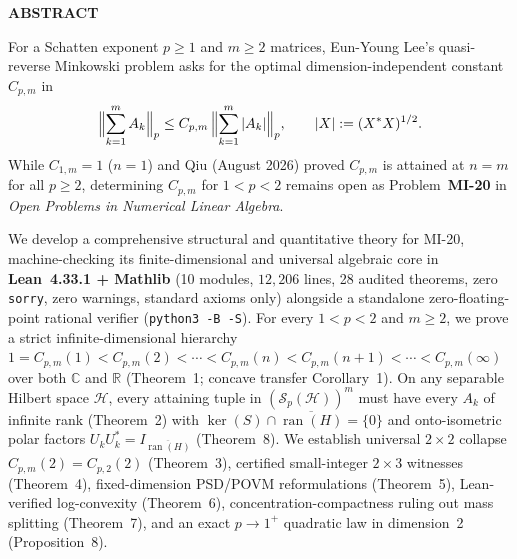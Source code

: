\documentclass[10pt,letterpaper]{article}
\newcommand{\C}{\mathbb{C}}
\newcommand{\R}{\mathbb{R}}
\newcommand{\Hilb}{\mathcal{H}}
\newcommand{\Sp}{\mathcal{S}_p}
\newcommand{\ran}{\operatorname{ran}}
\begin{document}
\begin{tcolorbox}[abstractbox]
{\sffamily\footnotesize\bfseries\color{accentblue}ABSTRACT}\par\vspace{1.5pt}
{\small
For a Schatten exponent $p \ge 1$ and $m \ge 2$ matrices, Eun-Young Lee's quasi-reverse Minkowski problem asks for the optimal dimension-independent constant $C_{p,m}$ in
\[
  \Bigl\|\sum_{k=1}^m A_k\Bigr\|_p \le C_{p,m}\,\Bigl\|\sum_{k=1}^m |A_k|\Bigr\|_p,
  \qquad |X| := (X^* X)^{1/2}.
\]
While $C_{1,m} = 1$ ($n = 1$) and Qiu (August 2026) proved $C_{p,m}$ is attained at $n = m$ for all $p \ge 2$, determining $C_{p,m}$ for $1 < p < 2$ remains open as Problem~\textbf{MI-20} in \emph{Open Problems in Numerical Linear Algebra}.

We develop a comprehensive structural and quantitative theory for MI-20, machine-checking its finite-dimensional and universal algebraic core in \textbf{Lean~4.33.1 + Mathlib} (10 modules, $12{,}206$ lines, 28 audited theorems, zero \texttt{sorry}, zero warnings, standard axioms only) alongside a standalone zero-floating-point rational verifier (\texttt{python3 -B -S}). For every $1 < p < 2$ and $m \ge 2$, we prove a strict infinite-dimensional hierarchy $1 = C_{p,m}(1) < C_{p,m}(2) < \cdots < C_{p,m}(n) < C_{p,m}(n+1) < \cdots < C_{p,m}(\infty)$ over both $\C$ and $\R$ (Theorem~1; concave transfer Corollary~1). On any separable Hilbert space $\Hilb$, every attaining tuple in $(\Sp(\Hilb))^m$ must have every $A_k$ of infinite rank (Theorem~2) with $\ker(S) \cap \overline{\ran(H)} = \{0\}$ and onto-isometric polar factors $U_k U_k^* = I_{\overline{\ran(H)}}$ (Theorem~8). We establish universal $2\times 2$ collapse $C_{p,m}(2) = C_{p,2}(2)$ (Theorem~3), certified small-integer $2\times 3$ witnesses (Theorem~4), fixed-dimension PSD/POVM reformulations (Theorem~5), Lean-verified log-convexity (Theorem~6), concentration-compactness ruling out mass splitting (Theorem~7), and an exact $p \to 1^+$ quadratic law in dimension~2 (Proposition~8).

}
\end{tcolorbox}
\end{document}
